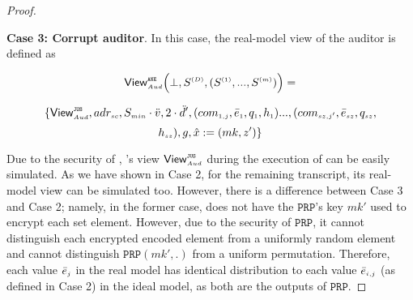 \begin{proof}
 
 \

\noindent\textbf{Case 3: Corrupt auditor}.  In this case, the real-model view of the auditor is defined as  

$$ \mathsf{View}_{\scriptscriptstyle Aud}^{\scriptscriptstyle \mathtt{ANE}} \Big(\bot, S^{\scriptscriptstyle (D)}, (S^{\scriptscriptstyle (1)},..., S^{\scriptscriptstyle (m)})\Big)=$$

$$ \{\mathsf{View}^{\scriptscriptstyle \mathtt{JUS}}_{\scriptscriptstyle Aud}, adr_{\scriptscriptstyle sc}, S_{\scriptscriptstyle min}\cdot \ddot{v}, 2\cdot \ddot{d}', (com_{\scriptscriptstyle 1,j}, \bar{e}_{\scriptscriptstyle 1}, q_{\scriptscriptstyle 1}, h_{\scriptscriptstyle 1})..., (com_{\scriptscriptstyle sz, j'}, \bar{e}_{\scriptscriptstyle sz}, q_{\scriptscriptstyle {sz}},$$ $$ h_{\scriptscriptstyle sz}), g, \hat{x}:=({mk}, z')\}$$


  Due to the security of \fpsi, \aud's view $\mathsf{View}^{\scriptscriptstyle \mathtt{JUS}}_{\scriptscriptstyle Aud}$ during the execution of \fpsi can be easily simulated. As we have shown in Case 2, for the remaining transcript, its real-model view can be simulated too. However, there is a difference between Case 3 and Case 2; namely, in the former case, \aud does not have the $\mathtt{PRP}$'s key $mk'$ used to encrypt each set element. However, due to the security of  $\mathtt{PRP}$, it cannot distinguish each encrypted encoded element from a uniformly random element and cannot distinguish $\mathtt{PRP}(mk',.)$ from a uniform permutation. Therefore, each value $\bar{e}_{\scriptscriptstyle j}$ in the real model has identical distribution to each value $\bar{e}_{\scriptscriptstyle i,j}$ (as defined in Case 2) in the ideal model, as both are the outputs of $\mathtt{PRP}$. 




 

\end{proof}
